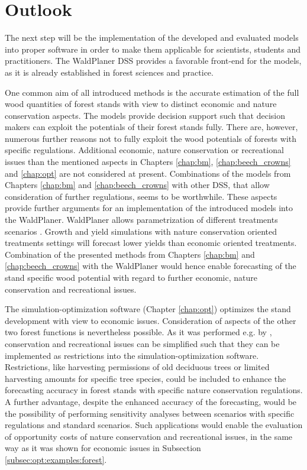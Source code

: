 \section{Outlook}
\label{sec:discussion:outlook}
The next step will be the implementation of the developed and evaluated models into proper software in order to make them applicable for scientists, students and practitioners. The WaldPlaner DSS provides a favorable front-end for the models, as it is already established in forest sciences and practice.

One common aim of all introduced methods is the accurate estimation of the full wood quantities of forest stands with view to distinct economic and nature conservation aspects. The models provide decision support such that decision makers can exploit the potentials of their forest stands fully. There are, however, numerous further reasons not to fully exploit the wood potentials of forests with specific regulations. Additional economic, nature conservation or recreational issues than the mentioned aspects in Chapters \ref{chap:bm}, \ref{chap:beech_crowns} and \ref{chap:opt} are not considered at present. Combinations of the models from Chapters \ref{chap:bm} and \ref{chap:beech_crowns} with other DSS, that allow consideration of further regulations, seems to be worthwhile. These aspects provide further arguments for an implementation of the introduced models into the WaldPlaner. WaldPlaner allows parametrization of different treatments scenarios \citep[p. 90-93]{hansen_2014}. Growth and yield simulations with nature conservation oriented treatments settings will forecast lower yields than economic oriented treatments. Combination of the presented methods from Chapters \ref{chap:bm} and \ref{chap:beech_crowns} with the WaldPlaner would hence enable forecasting of the stand specific wood potential with regard to further economic, nature conservation and recreational issues.

The si\-mu\-la\-tion-op\-ti\-mi\-za\-tion software (Chapter \ref{chap:opt}) optimizes the stand development with view to economic issues. Consideration of aspects of the other two forest functions is nevertheless possible. As it was performed e.g. by \citet{yousefpour_2009}, conservation and recreational issues can be simplified such that they can be implemented as restrictions into the si\-mu\-la\-tion-op\-ti\-mi\-za\-tion software. Restrictions, like harvesting permissions of old deciduous trees or limited harvesting amounts for specific tree species, could be included to enhance the forecasting accuracy in forest stands with specific nature conservation regulations. A further advantage, despite the enhanced accuracy of the forecasting, would be the possibility of performing sensitivity analyses between scenarios with specific regulations and standard scenarios. Such applications would enable the evaluation of opportunity costs of nature conservation and recreational issues, in the same way as it was shown for economic issues in Subsection \ref{subsec:opt:examples:forest}.

